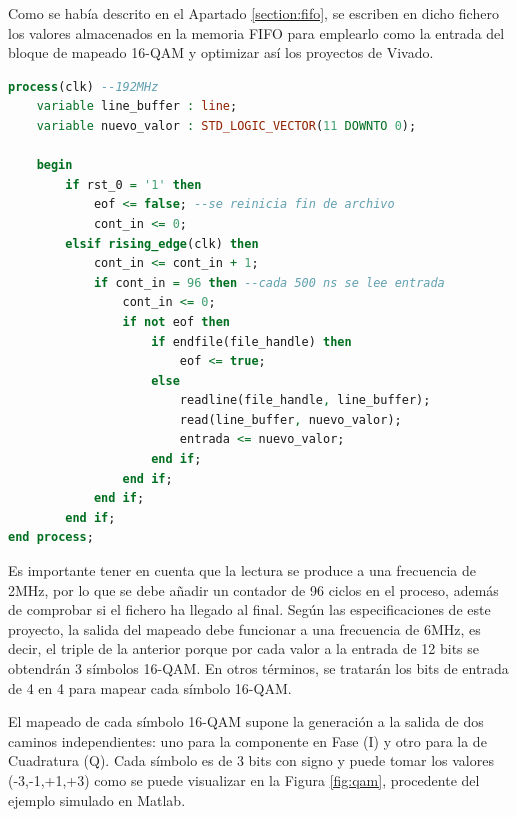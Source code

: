Como se había descrito en el Apartado \ref{section:fifo}, se escriben en dicho fichero los valores almacenados en la memoria FIFO para emplearlo como la entrada del bloque de mapeado 16-QAM y optimizar así los proyectos de Vivado.

\vspace{5mm}

\begin{lstlisting}[language=VHDL, style=mystyle, caption={Proceso de lectura del fichero FIFO\_out.txt}]
	process(clk) --192MHz
    variable line_buffer : line;
    variable nuevo_valor : STD_LOGIC_VECTOR(11 DOWNTO 0);
    
    begin
        if rst_0 = '1' then
            eof <= false; --se reinicia fin de archivo
            cont_in <= 0;
        elsif rising_edge(clk) then
            cont_in <= cont_in + 1;
            if cont_in = 96 then --cada 500 ns se lee entrada
                cont_in <= 0;
                if not eof then
                    if endfile(file_handle) then 
                        eof <= true; 
                    else
                        readline(file_handle, line_buffer);
                        read(line_buffer, nuevo_valor);
                        entrada <= nuevo_valor;
                    end if;
                end if;
            end if;                      
        end if;
end process;  
\end{lstlisting}

\vspace{3mm}

Es importante tener en cuenta que la lectura se produce a una frecuencia de 2MHz, por lo que se debe añadir un contador de 96 ciclos en el proceso, además de comprobar si el fichero ha llegado al final. Según las especificaciones de este proyecto, la salida del mapeado debe funcionar a una frecuencia de 6MHz, es decir, el triple de la anterior porque por cada valor a la entrada de 12 bits se obtendrán 3 símbolos 16-QAM. En otros términos, se tratarán los bits de entrada de 4 en 4 para mapear cada símbolo 16-QAM. 

El mapeado de cada símbolo 16-QAM supone la generación a la salida de dos caminos independientes: uno para la componente en Fase (I) y otro para la de Cuadratura (Q). Cada símbolo es de 3 bits con signo y puede tomar los valores (-3,-1,+1,+3) como se puede visualizar en la Figura \ref{fig:qam}, procedente del ejemplo simulado en Matlab.

\pagebreak

